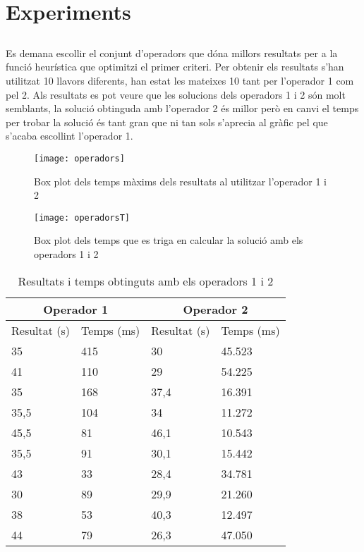 \documentclass[a4paper, 12pt]{article}
\begin{document}
\section{Experiments}
\subsection{}
Es demana escollir el conjunt d'operadors que dóna millors resultats per a la funció heurística que optimitzi el 
primer criteri. Per obtenir els resultats s'han utilitzat 10 llavors diferents, han estat les mateixes 10 tant per l'operador 1 
com pel 2. Als resultats es pot veure que les solucions dels operadors 1 i 2 són molt semblants, la solució
obtinguda amb l'operador 2 és millor però en canvi el temps per trobar la solució és tant gran que ni tan sols s'aprecia
al gràfic pel que s'acaba escollint l'operador 1.

\begin{figure}[h]
\centering
\begin{minipage}[t]{0.48\textwidth}
\texttt{[image: operadors]}
\caption{Box plot dels temps màxims dels resultats al utilitzar l'operador 1 i 2}
\end{minipage}
\hfill
\begin{minipage}[t]{0.48\textwidth}
\texttt{[image: operadorsT]}
\caption{Box plot dels temps que es triga en calcular la solució amb els operadors 1 i 2}
\end{minipage}
\end{figure}

\begin{table}[h!]
\begin{tabular}{l | l || l | l}
	\multicolumn{2}{c||}{Operador 1} & \multicolumn{2}{|c}{Operador 2} \\
	\hline
	Resultat (s) & Temps (ms) & Resultat (s) & Temps (ms) \\
	\hline
	35 & 415 & 30 & 45.523 \\
	41 & 110 & 29 & 54.225 \\
	35 & 168 & 37,4 & 16.391 \\
	35,5 & 104 & 34 & 11.272 \\
	45,5 & 81	& 46,1 & 10.543 \\
	35,5 & 91 & 30,1 & 15.442 \\
	43 & 33 & 28,4 & 34.781 \\
	30 & 89 & 29,9 & 21.260 \\
	38 & 53 & 40,3 & 12.497 \\
	44 & 79 & 26,3 & 47.050 \\
\end{tabular}
\caption{Resultats i temps obtinguts amb els operadors 1 i 2}
\end{table}
\end{document}
